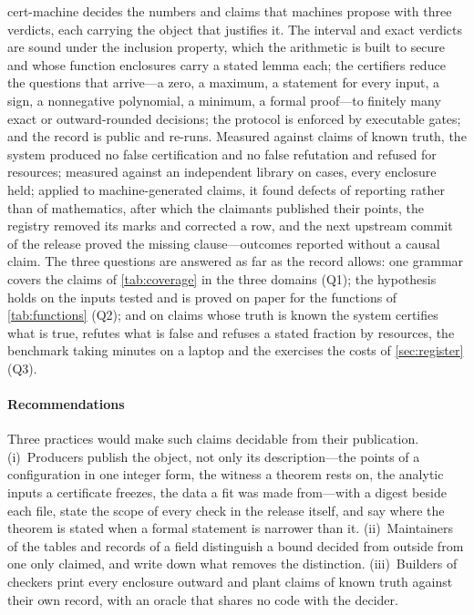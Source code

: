 \documentclass[preprint,11pt,a4paper]{elsarticle}
\theoremstyle{definition}
\begin{document}
cert-machine decides the numbers and claims that machines propose with three verdicts, each carrying the object that justifies it. The interval and exact verdicts are sound under the inclusion property, which the arithmetic is built to secure and whose function enclosures carry a stated lemma each; the certifiers reduce the questions that arrive---a zero, a maximum, a statement for every input, a sign, a nonnegative polynomial, a minimum, a formal proof---to finitely many exact or outward-rounded decisions; the protocol is enforced by executable gates; and the record is public and re-runs. Measured against \MtSaMutants{} claims of known truth, the system produced no false certification and no false refutation and refused \MtSaRefusalsOnFalse{} for resources; measured against an independent library on \MtArbCases{} cases, every enclosure held; applied to \RegRows{} machine-generated claims, it found defects of reporting rather than of mathematics, after which the claimants published their points, the registry removed its marks and corrected a row, and the next upstream commit of the release proved the missing clause---outcomes reported without a causal claim. The three questions are answered as far as the record allows: one grammar covers the claims of \cref{tab:coverage} in the three domains (Q1); the hypothesis holds on the inputs tested and is proved on paper for the functions of \cref{tab:functions} (Q2); and on claims whose truth is known the system certifies what is true, refutes what is false and refuses a stated fraction by resources, the benchmark taking \MtSaMinutes{} minutes on a laptop and the exercises the costs of \cref{sec:register} (Q3).

\paragraph{Recommendations} Three practices would make such claims decidable from their publication. (i)~Producers publish the object, not only its description---the points of a configuration in one integer form, the witness a theorem rests on, the analytic inputs a certificate freezes, the data a fit was made from---with a digest beside each file, state the scope of every check in the release itself, and say where the theorem is stated when a formal statement is narrower than it. (ii)~Maintainers of the tables and records of a field distinguish a bound decided from outside from one only claimed, and write down what removes the distinction. (iii)~Builders of checkers print every enclosure outward and plant claims of known truth against their own record, with an oracle that shares no code with the decider.
\end{document}
